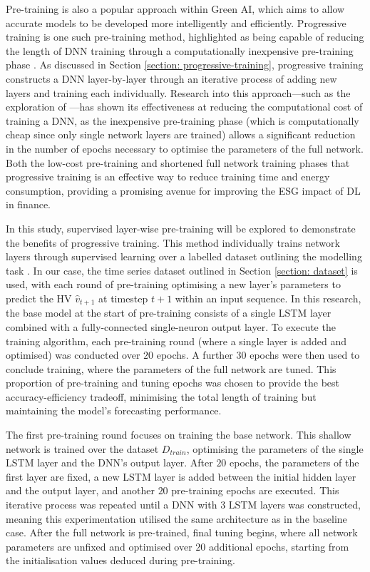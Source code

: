 \documentclass[a4paper, 11pt]{report}
\begin{document}
    Pre-training is also a popular approach within Green AI, which aims to allow accurate models to be developed more intelligently and efficiently. Progressive training is one such pre-training method, highlighted as being capable of reducing the length of DNN training through a computationally inexpensive pre-training phase \citep{xu-2021}. As discussed in Section \ref{section: progressive-training}, progressive training constructs a DNN layer-by-layer through an iterative process of adding new layers and training each individually. Research into this approach---such as the exploration of \citet{ienco-2019}---has shown its effectiveness at reducing the computational cost of training a DNN, as the inexpensive pre-training phase (which is computationally cheap since only single network layers are trained) allows a significant reduction in the number of epochs necessary to optimise the parameters of the full network. Both the low-cost pre-training and shortened full network training phases that progressive training is an effective way to reduce training time and energy consumption, providing a promising avenue for improving the ESG impact of DL in finance.

    In this study, supervised layer-wise pre-training will be explored to demonstrate the benefits of progressive training. This method individually trains network layers through supervised learning over a labelled dataset outlining the modelling task \citep{ienco-2019}. In our case, the time series dataset outlined in Section \ref{section: dataset} is used, with each round of pre-training optimising a new layer's parameters to predict the HV $\hat{v}_{t+1}$ at timestep $t+1$ within an input sequence. In this research, the base model at the start of pre-training consists of a single LSTM layer combined with a fully-connected single-neuron output layer. To execute the training algorithm, each pre-training round (where a single layer is added and optimised) was conducted over $20$ epochs. A further $30$ epochs were then used to conclude training, where the parameters of the full network are tuned. This proportion of pre-training and tuning epochs was chosen  to provide the best accuracy-efficiency tradeoff, minimising the total length of training but maintaining the model's forecasting performance. 

    The first pre-training round focuses on training the base network. This shallow network is trained over the dataset $D_{train}$, optimising the parameters of the single LSTM layer and the DNN's output layer. After $20$ epochs, the parameters of the first layer are fixed, a new LSTM layer is added between the initial hidden layer and the output layer, and another $20$ pre-training epochs are executed. This iterative process was repeated until a DNN with $3$ LSTM layers was constructed, meaning this experimentation utilised the same architecture as in the baseline case. After the full network is pre-trained, final tuning begins, where all network parameters are unfixed and optimised over $20$ additional epochs, starting from the initialisation values deduced during pre-training.
\end{document}
